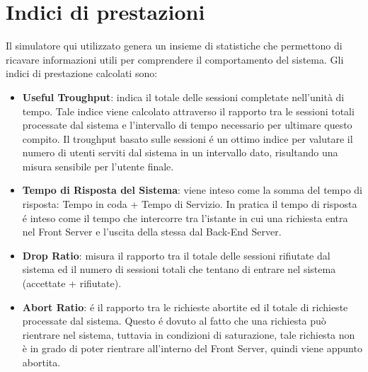 \section{Indici di prestazioni}
Il simulatore qui utilizzato genera un insieme di statistiche che permettono di ricavare 
informazioni utili per comprendere il comportamento del sistema.
\vspace{0.5cm}
\noindent Gli indici di prestazione calcolati sono:
\begin{itemize}
\item \textbf{Useful Troughput}:
indica il totale delle sessioni completate nell'unit\`a di tempo. 
Tale indice viene calcolato attraverso il rapporto tra le sessioni totali 
processate dal sistema e l'intervallo di tempo necessario per ultimare questo 
compito. Il troughput basato sulle sessioni \'e un ottimo indice per valutare 
il numero di utenti serviti dal sistema in un intervallo dato, risultando una 
misura sensibile per l'utente finale.

\item \textbf{Tempo di Risposta del Sistema}:
viene inteso come la somma del tempo di risposta: Tempo in coda + Tempo di 
Servizio.
In pratica il tempo di risposta \'e inteso come il tempo che intercorre tra l'istante in cui una
richiesta entra nel Front Server e l'uscita della stessa dal Back-End Server.

\item \textbf{Drop Ratio}:
misura il rapporto tra il totale delle sessioni rifiutate dal sistema ed il 
numero di sessioni totali che tentano di entrare nel sistema (accettate + 
rifiutate).

\item \textbf{Abort Ratio}:
\'e il rapporto tra le richieste abortite ed il totale di richieste processate 
dal sistema.
Questo \'e dovuto al fatto che una richiesta pu\`o rientrare nel sistema, 
tuttavia in condizioni di saturazione, tale richiesta non \`e in grado di poter 
rientrare all'interno del Front Server, quindi viene appunto abortita.

\end{itemize}
